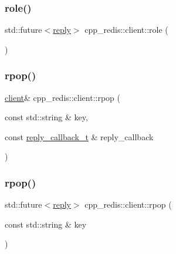 \mbox{\label{classcpp__redis_1_1client_a34abe0819734b88704d89972b651e7ed}} 
\subsubsection{\texorpdfstring{role()}{role()}\hspace{0.1cm}{\footnotesize\ttfamily [2/2]}}
{\footnotesize\ttfamily std\+::future$<$\hyperlink{classcpp__redis_1_1reply}{reply}$>$ cpp\+\_\+redis\+::client\+::role (\begin{DoxyParamCaption}{ }\end{DoxyParamCaption})}

\mbox{\label{classcpp__redis_1_1client_aa29c7c00278934074e3cdbf70c0bb9cc}} 
\subsubsection{\texorpdfstring{rpop()}{rpop()}\hspace{0.1cm}{\footnotesize\ttfamily [1/2]}}
{\footnotesize\ttfamily \hyperlink{classcpp__redis_1_1client}{client}\& cpp\+\_\+redis\+::client\+::rpop (\begin{DoxyParamCaption}\item[{const std\+::string \&}]{key,  }\item[{const \hyperlink{classcpp__redis_1_1client_a061a1140d36d2eaeda82b09a0bb3f9f2}{reply\+\_\+callback\+\_\+t} \&}]{reply\+\_\+callback }\end{DoxyParamCaption})}

\mbox{\label{classcpp__redis_1_1client_a7a2ea6e56ce9fa430cfc44ada77d960b}} 
\subsubsection{\texorpdfstring{rpop()}{rpop()}\hspace{0.1cm}{\footnotesize\ttfamily [2/2]}}
{\footnotesize\ttfamily std\+::future$<$\hyperlink{classcpp__redis_1_1reply}{reply}$>$ cpp\+\_\+redis\+::client\+::rpop (\begin{DoxyParamCaption}\item[{const std\+::string \&}]{key }\end{DoxyParamCaption})}

